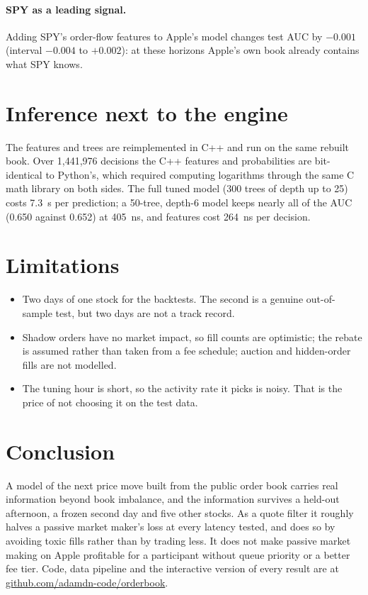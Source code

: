 \documentclass[11pt]{article}
\begin{document}
\paragraph{SPY as a leading signal.} Adding SPY's order-flow features to Apple's model changes test AUC by $-0.001$ (interval $-0.004$ to $+0.002$): at these horizons Apple's own book already contains what SPY knows.

\section{Inference next to the engine}
The features and trees are reimplemented in C++ and run on the same rebuilt book. Over 1{,}441{,}976 decisions the C++ features and probabilities are bit-identical to Python's, which required computing logarithms through the same C math library on both sides. The full tuned model (300 trees of depth up to 25) costs 7.3~\textmu s per prediction; a 50-tree, depth-6 model keeps nearly all of the AUC (0.650 against 0.652) at 405~ns, and features cost 264~ns per decision.

\section{Limitations}
\begin{itemize}
\item Two days of one stock for the backtests. The second is a genuine out-of-sample test, but two days are not a track record.
\item Shadow orders have no market impact, so fill counts are optimistic; the rebate is assumed rather than taken from a fee schedule; auction and hidden-order fills are not modelled.
\item The tuning hour is short, so the activity rate it picks is noisy. That is the price of not choosing it on the test data.
\end{itemize}

\section{Conclusion}
A model of the next price move built from the public order book carries real information beyond book imbalance, and the information survives a held-out afternoon, a frozen second day and five other stocks. As a quote filter it roughly halves a passive market maker's loss at every latency tested, and does so by avoiding toxic fills rather than by trading less. It does not make passive market making on Apple profitable for a participant without queue priority or a better fee tier. Code, data pipeline and the interactive version of every result are at \href{https://github.com/adamdn-code/orderbook}{github.com/adamdn-code/orderbook}.
\end{document}
